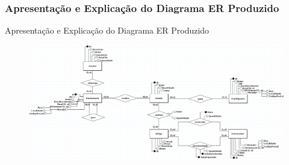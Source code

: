 \documentclass[compress,svgnames,handout,13.7pt]{beamer}
\begin{document}
\subsubsection{Apresentação e Explicação do Diagrama ER Produzido}
\begin{frame}{Apresentação e Explicação do Diagrama ER Produzido}
\begin{figure}[h]
            \centering
            \includegraphics[width=4.7in]{images/Conceitual_Com_Atributos.png}
        \end{figure}
\end{frame}
\end{document}
